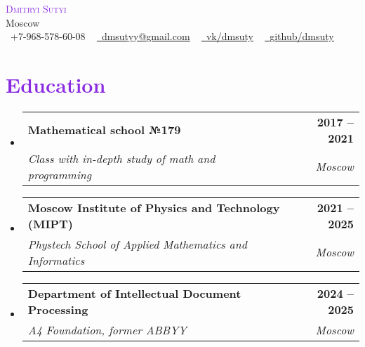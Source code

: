 \documentclass[letterpaper,11pt]{article}
\makeatletter
\newcommand{\resumeSubheading}[4]{
  \vspace{-2pt}\item
    \begin{tabular*}{1.0\textwidth}[t]{l@{\extracolsep{\fill}}r}
      \textbf{#1} & \textbf{\small #2} \\
      \textit{\small#3} & \textit{\small #4} \\
    \end{tabular*}\vspace{-7pt}
}
\newcommand{\resumeSubHeadingListStart}{\begin{itemize}[leftmargin=0.0in, label={}]}
\newcommand{\resumeSubHeadingListEnd}{\end{itemize}}
\makeatother
\begin{document}

\begin{center}
    \textcolor{BlueViolet}{\Huge \scshape Dmitryi Sutyi} \\ \vspace{1pt}
    Moscow\\ \vspace{1pt}
    \small \raisebox{-0.1\height}\faPhone\ +7-968-578-60-08 ~ \href{mailto:dmsutyy@gmail.com}{\raisebox{-0.2\height}\faEnvelope\  \underline{dmsutyy@gmail.com}} ~ 
    \href{https://vk.com/dmsuty}{\raisebox{-0.2\height}\faVk\ \underline{vk/dmsuty}}  ~
    \href{https://github.com/}{\raisebox{-0.2\height}\faGithub\ \underline{github/dmsuty}}
    \vspace{-8pt}
\end{center}


\section{\textcolor{BlueViolet}{Education}}
  \resumeSubHeadingListStart
    \resumeSubheading
      {Mathematical school №179}{2017 -- 2021}
      {Class with in-depth study of math and programming}{Moscow}
    \resumeSubheading
      {Moscow Institute of Physics and Technology (MIPT)}{2021 -- 2025}
      {Phystech School of Applied Mathematics and Informatics}{Moscow}
    \resumeSubheading
      {Department of Intellectual Document Processing}{2024 -- 2025}
      {A4 Foundation, former ABBYY}{Moscow}
  \resumeSubHeadingListEnd
  

\end{document}
